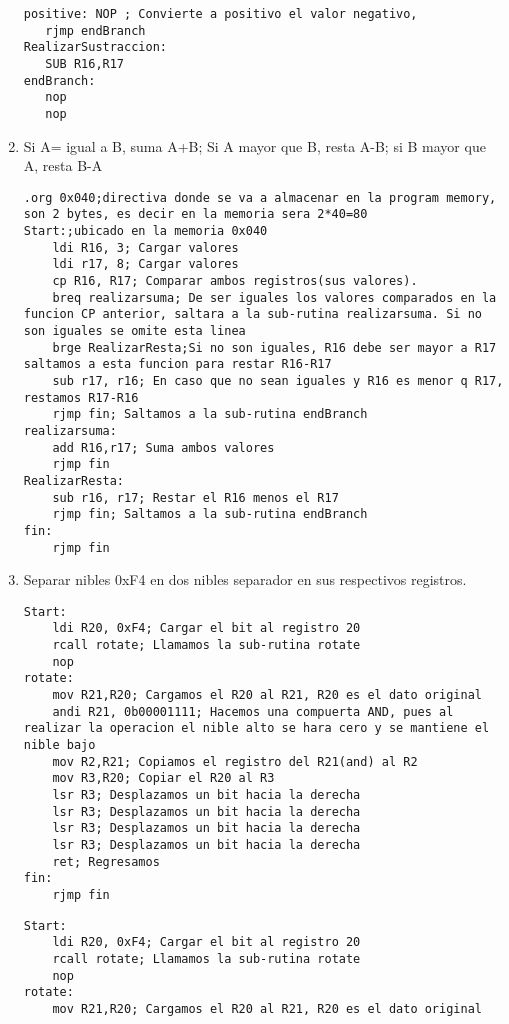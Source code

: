 \documentclass[
	12pt, %
	fleqn, %
	a4paper, %
]{LegrandOrangeBook}
\begin{document}
\begin{enumerate}
\begin{lstlisting}[language={[x86masm]Assembler},frame=single,caption={Desarrolo entre más de 2 sub-rutinas},captionpos=b,numbers=none]
   positive: NOP ; Convierte a positivo el valor negativo,
   rjmp endBranch
RealizarSustraccion:
   SUB R16,R17
endBranch:
   nop 
   nop
\end{lstlisting}
\item Si A= igual a B, suma A+B; Si A mayor que B, resta A-B; si B mayor que A, resta B-A
\begin{lstlisting}[language={[x86masm]Assembler},frame=single,caption={Condicional de suma entre dos números},captionpos=b]
.org 0x040;directiva donde se va a almacenar en la program memory, son 2 bytes, es decir en la memoria sera 2*40=80
Start:;ubicado en la memoria 0x040	
	ldi R16, 3; Cargar valores
	ldi r17, 8; Cargar valores
	cp R16, R17; Comparar ambos registros(sus valores).
	breq realizarsuma; De ser iguales los valores comparados en la funcion CP anterior, saltara a la sub-rutina realizarsuma. Si no son iguales se omite esta linea
	brge RealizarResta;Si no son iguales, R16 debe ser mayor a R17 saltamos a esta funcion para restar R16-R17
	sub r17, r16; En caso que no sean iguales y R16 es menor q R17, restamos R17-R16
	rjmp fin; Saltamos a la sub-rutina endBranch
realizarsuma:
	add R16,r17; Suma ambos valores
	rjmp fin
RealizarResta:
	sub r16, r17; Restar el R16 menos el R17
	rjmp fin; Saltamos a la sub-rutina endBranch
fin:
	rjmp fin
\end{lstlisting}
\item Separar nibles 0xF4 en dos nibles separador en sus respectivos registros.
\begin{lstlisting}[language={[x86masm]Assembler},frame=single,caption={Separar nibles usando  LSR},captionpos=b,numbers=none]
Start:
	ldi R20, 0xF4; Cargar el bit al registro 20
	rcall rotate; Llamamos la sub-rutina rotate
	nop
rotate:
	mov R21,R20; Cargamos el R20 al R21, R20 es el dato original
	andi R21, 0b00001111; Hacemos una compuerta AND, pues al realizar la operacion el nible alto se hara cero y se mantiene el nible bajo
	mov R2,R21; Copiamos el registro del R21(and) al R2
	mov R3,R20; Copiar el R20 al R3
	lsr R3; Desplazamos un bit hacia la derecha
	lsr R3; Desplazamos un bit hacia la derecha
	lsr R3; Desplazamos un bit hacia la derecha
	lsr R3; Desplazamos un bit hacia la derecha
	ret; Regresamos
fin:
	rjmp fin
\end{lstlisting}
\begin{lstlisting}[language={[x86masm]Assembler},frame=single,caption={Usando ROR},captionpos=b,numbers=none]
Start:
	ldi R20, 0xF4; Cargar el bit al registro 20
	rcall rotate; Llamamos la sub-rutina rotate
	nop
rotate:
	mov R21,R20; Cargamos el R20 al R21, R20 es el dato original

\end{lstlisting}
\end{enumerate}
\end{document}
